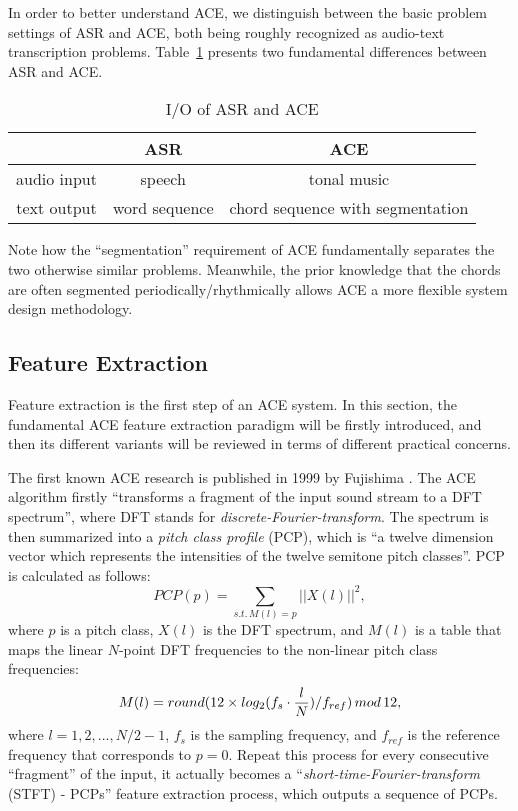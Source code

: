 In order to better understand ACE, we distinguish between the basic problem settings of ASR and ACE, both being roughly recognized as audio-text transcription problems. Table~\ref{tab:2-asrace} presents two fundamental differences between ASR and ACE.
\begin{table}[htb]
\centering
\footnotesize
\begin{tabular}{|c|c|c|} \hline
	& ASR & ACE \\ \hline
audio input & speech & tonal music \\ \hline
text output & word sequence & chord sequence with segmentation \\ \hline
\end{tabular}
\caption{I/O of ASR and ACE}
\label{tab:2-asrace}
\end{table}
Note how the ``segmentation'' requirement of ACE fundamentally separates the two otherwise similar problems. Meanwhile, the prior knowledge that the chords are often segmented periodically/rhythmically allows ACE a more flexible system design methodology.


\subsection{Feature Extraction} \label{sec:2-fe}
Feature extraction is the first step of an ACE system. In this section, the fundamental ACE feature extraction paradigm will be firstly introduced, and then its different variants will be reviewed in terms of different practical concerns.

The first known ACE research is published in 1999 by Fujishima \cite{fujishima1999realtime}. The ACE algorithm firstly ``transforms a fragment of the input sound stream to a DFT spectrum'', where DFT stands for {\it discrete-Fourier-transform}. The spectrum is then summarized into a {\it pitch class profile} (PCP), which is ``a twelve dimension vector which represents the intensities of the twelve semitone pitch classes''. PCP is calculated as follows:
\begin{equation}
PCP(p) = \sum_{s.t.\,M(l)=p}{||X(l)||^2},
\end{equation}
where $p$ is a pitch class, $X(l)$ is the DFT spectrum, and $M(l)$ is a table that maps the linear $N$-point DFT frequencies to the non-linear pitch class frequencies:
\begin{equation}
M(l) = round(12 \times log_2({f_s} \cdot {l\over N})/f_{ref})\,mod\,12,
\end{equation}
where $l=1,2,...,N/2-1$, $f_s$ is the sampling frequency, and $f_{ref}$ is the reference frequency that corresponds to $p=0$. Repeat this process for every consecutive ``fragment'' of the input, it actually becomes a ``{\it short-time-Fourier-transform} (STFT) - PCPs'' feature extraction process, which outputs a sequence of PCPs.

